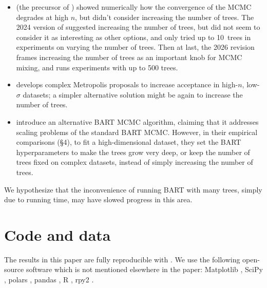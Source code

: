 \documentclass{article}
\newcommand{\redactedcite}[1]{#1}
\begin{document}
\begin{itemize}

	\item \citet[\S4.1]{ronen2022} (the precursor of
		\cite{tan2026computationalefficiencybayesianadditive}) showed
		numerically how the convergence of the MCMC degrades at high
		$n$, but didn't consider increasing the number of trees. The
		2024 version of
		\textcite{tan2026computationalefficiencybayesianadditive}
		suggested increasing the number of trees, but did not seem to
		consider it as interesting as other options, and only tried up
		to 10~trees in experiments on varying the number of trees. Then at last, the 2026 revision
		frames increasing the number of trees as an important knob for MCMC
		mixing, and runs experiments with up to 500 trees.

	\item \citet{pratola2016} develops complex Metropolis proposals to increase
	      acceptance in high-$n$, low-$\sigma$ datasets; a simpler alternative
	      solution might be again to increase the number of trees.

	\item \citet{lakshminarayanan_particle_2015} introduce an alternative BART
	      MCMC algorithm, claiming that it addresses scaling problems of the standard
	      BART MCMC. However, in their empirical comparisons (\S4), to fit a
	      high-dimensional dataset, they set the BART hyperparameters to make the
	      trees grow very deep, or keep the number of trees fixed on complex datasets, instead of simply increasing the number of trees.

\end{itemize}
%
We hypothesize that the inconvenience of running BART with many trees, simply
due to running time, may have slowed progress in this area.

\section{Code and data}
\label{sec:code}

The results in this paper are fully reproducible with
\redactedcite{\citet{gattocrucco_2026_24033756}}. We use the following open-source software
which is not mentioned elsewhere in the paper: Matplotlib \autocite{matplotlib},
SciPy \autocite{scipy}, polars \autocite{ritchie_vink_2026_19699949},
pandas \autocite{mckinney-proc-scipy-2010}, R \autocite{erre}, rpy2
\autocite{gautier2026rpy2}.
\end{document}
